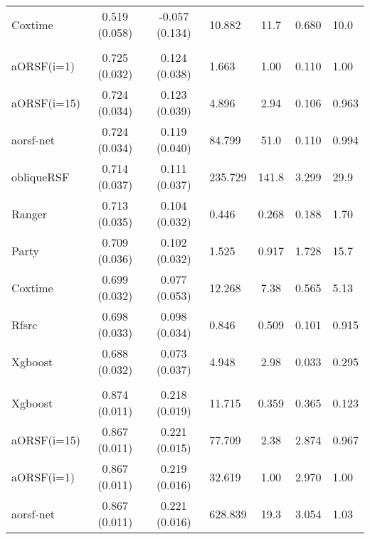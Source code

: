 \documentclass[twoside,11pt]{article}\usepackage[]{graphicx}\usepackage[]{color}
\newenvironment{knitrout}{}{} %
\begin{document}
\begin{knitrout}
\begin{longtable}{lcclccl}
\hspace{1em}Coxtime & 0.519 (0.058) & -0.057 (0.134) & 10.882 & 11.7 & 0.680 & 10.0\\
\addlinespace[0.3em]
\hline
\multicolumn{7}{l}{\textit{\textbf{guide\_it}}}\\
\hline
\hspace{1em}aORSF(i=1) & 0.725 (0.032) & 0.124 (0.038) & 1.663 & 1.00 & 0.110 & 1.00\\
\hspace{1em}aORSF(i=15) & 0.724 (0.034) & 0.123 (0.039) & 4.896 & 2.94 & 0.106 & 0.963\\
\hspace{1em}aorsf-net & 0.724 (0.034) & 0.119 (0.040) & 84.799 & 51.0 & 0.110 & 0.994\\
\hspace{1em}obliqueRSF & 0.714 (0.037) & 0.111 (0.037) & 235.729 & 141.8 & 3.299 & 29.9\\
\hspace{1em}Ranger & 0.713 (0.035) & 0.104 (0.032) & 0.446 & 0.268 & 0.188 & 1.70\\
\hspace{1em}Party & 0.709 (0.036) & 0.102 (0.032) & 1.525 & 0.917 & 1.728 & 15.7\\
\hspace{1em}Coxtime & 0.699 (0.032) & 0.077 (0.053) & 12.268 & 7.38 & 0.565 & 5.13\\
\hspace{1em}Rfsrc & 0.698 (0.033) & 0.098 (0.034) & 0.846 & 0.509 & 0.101 & 0.915\\
\hspace{1em}Xgboost & 0.688 (0.032) & 0.073 (0.037) & 4.948 & 2.98 & 0.033 & 0.295\\
\addlinespace[0.3em]
\hline
\multicolumn{7}{l}{\textit{\textbf{Mayo Clinic Primary Biliary Cholangitis Data, N = 276}}}\\
\hline
\hspace{1em}Xgboost & 0.874 (0.011) & 0.218 (0.019) & 11.715 & 0.359 & 0.365 & 0.123\\
\hspace{1em}aORSF(i=15) & 0.867 (0.011) & 0.221 (0.015) & 77.709 & 2.38 & 2.874 & 0.967\\
\hspace{1em}aORSF(i=1) & 0.867 (0.011) & 0.219 (0.016) & 32.619 & 1.00 & 2.970 & 1.00\\
\hspace{1em}aorsf-net & 0.867 (0.011) & 0.221 (0.016) & 628.839 & 19.3 & 3.054 & 1.03\\

\end{longtable}
\end{knitrout}
\end{document}

